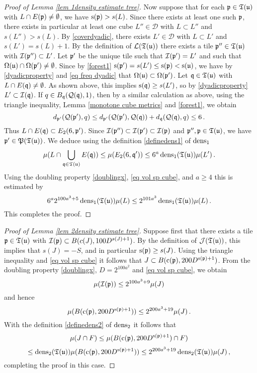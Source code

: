 {\begin{proof}[Proof of Lemma \ref{lem 1density estimate tree}]
    Now suppose that for each $\mathfrak p \in \mathfrak T(\mathfrak u)$ with $L \cap E(\mathfrak p) \ne \emptyset$, we have $\mathrm{s}(\mathfrak p) > s(L)$. Since there exists at least one such $\mathfrak p$, there exists in particular at least one cube $L'' \in \mathcal{D}$ with $L \subset L''$ and $s(L'') > s(L)$. By \eqref{coverdyadic}, there exists $L' \in \mathcal{D}$ with $L \subset L'$ and $s(L') = s(L) + 1$. By the definition of $\mathcal{L}(\mathfrak T(\mathfrak u))$ there exists a tile $\mathfrak p'' \in \mathfrak T(\mathfrak u)$ with $\mathcal{I}(\mathfrak p'') \subset L'$. Let $\mathfrak p'$ be the unique tile such that $\mathcal{I}(\mathfrak p') = L'$ and such that $\Omega(\mathfrak u) \cap \Omega(\mathfrak p') \ne \emptyset$. Since by \eqref{forest1} $\mathrm{s}(\mathfrak p') = s(L') \le \mathrm{s}(\mathfrak p) < \mathrm{s}(\mathfrak u)$, we have by \eqref{dyadicproperty} and \eqref{eq freq dyadic} that $\Omega(\mathfrak u) \subset \Omega(\mathfrak p')$. Let $\mathfrak q \in \mathfrak T(\mathfrak u)$ with $L \cap E(\mathfrak q) \ne \emptyset$. As shown above, this implies $\mathrm{s}(\mathfrak q) \ge s(L')$, so by \eqref{dyadicproperty} $L' \subset \mathcal{I}(\mathfrak q)$. If $q \in B_{\mathfrak q}(\mathcal{Q}(\mathfrak q), 1)$, then by a similar calculation as above, using the triangle inequality, Lemma \ref{monotone cube metrics} and \eqref{forest1}, we obtain
    $$
        d_{\mathfrak p'}(\mathcal{Q}(\mathfrak p'), q) \le d_{\mathfrak p'}(\mathcal{Q}(\mathfrak p'), \mathcal{Q}(\mathfrak q)) + d_{\mathfrak q}(\mathcal{Q}(\mathfrak q), q) \le 6\,.
    $$
    Thus $L \cap E(\mathfrak q) \subset E_2(6, \mathfrak p')$. Since $\mathcal{I}(\mathfrak p'') \subset \mathcal{I}(\mathfrak p') \subset \mathcal{I}(\mathfrak p)$ and $\mathfrak p'', \mathfrak p \in \mathfrak T(\mathfrak u)$, we have $\mathfrak p' \in \mathfrak P(\mathfrak T(\mathfrak u))$. We deduce using the definition \eqref{definedens1} of $\operatorname{\operatorname{dens}}_1$
    $$
        \mu(L \cap \bigcup_{\mathfrak q \in \mathfrak T(\mathfrak u)} E(\mathfrak q)) \le \mu(E_2(6, \mathfrak q')) \le 6^a \operatorname{\operatorname{dens}}_1(\mathfrak T(\mathfrak u)) \mu(L')\,.
    $$
    Using the doubling property \eqref{doublingx}, \eqref{eq vol sp cube}, and $a \ge 4$ this is estimated by
    $$
        6^a 2^{100a^3 + 5}\operatorname{\operatorname{dens}}_1(\mathfrak T(\mathfrak u)) \mu(L) \le 2^{101 a^3} \operatorname{\operatorname{dens}}_1(\mathfrak T(\mathfrak u))\mu(L)\,.
    $$
    This completes the proof.
\end{proof}

\begin{proof}[Proof of Lemma \ref{lem 2density estimate tree}]
    Suppose first that there exists a tile $\mathfrak p \in \mathfrak T(\mathfrak u)$ with $\mathcal{I}(\mathfrak p) \subset B(c(J), 100 D^{s(J) + 1})$. By the definition of $\mathcal{J}(\mathfrak T(\mathfrak u))$, this implies that $s(J) = -S$, and in particular $\mathrm{s}(\mathfrak p) \ge s(J)$. Using the triangle inequality and \eqref{eq vol sp cube} it follows that $J \subset B(\mathrm{c}(\mathfrak p), 200 D^{\mathrm{s}(\mathfrak p) + 1})$. From the doubling property \eqref{doublingx}, $D=2^{100a^2}$ and \eqref{eq vol sp cube}, we obtain
    $$
        \mu(\mathcal{I}(\mathfrak p)) \le 2^{100a^3 + 9} \mu(J)
    $$
    and hence
    $$
        \mu( B(\mathrm{c}(\mathfrak p), 200 D^{\mathrm{s}(\mathfrak p) + 1})) \le 2^{200a^3 +19} \mu(J)\,.
    $$
    With the definition \eqref{definedens2} of $\operatorname{\operatorname{dens}}_2$ it follows that
    $$
        \mu(J \cap F) \le \mu( B(\mathrm{c}(\mathfrak p), 200 D^{\mathrm{s}(\mathfrak p) + 1}) \cap F)
    $$
    $$
        \le \operatorname{\operatorname{dens}}_2(\mathfrak T(\mathfrak u)) \mu( B(\mathrm{c}(\mathfrak p), 200 D^{\mathrm{s}(\mathfrak p) + 1})) \le 2^{200a^3 +19} \operatorname{\operatorname{dens}}_2(\mathfrak T(\mathfrak u))\mu(J)\,,
    $$
    completing the proof in this case.


\end{proof}}
